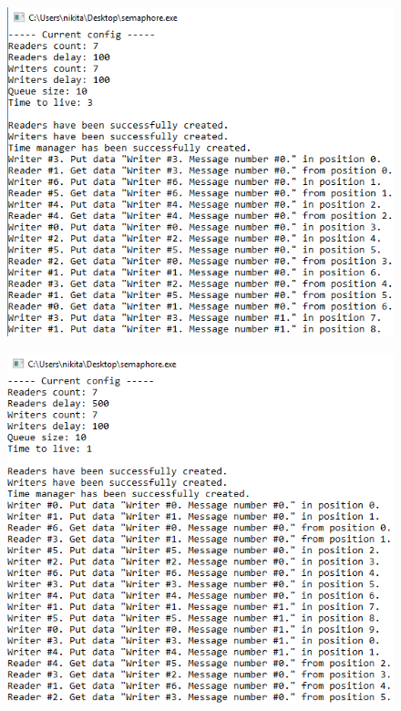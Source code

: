 \documentclass[14pt,a4paper,report]{report}
\begin{document}
\begin{figure}[h!]
	\centering
	\includegraphics[scale = 0.75]{images/p1_3_1.png}
	
	\caption{}
	\label{image:5}
\end{figure}

\begin{figure}[h!]
	\centering
	\includegraphics[scale = 0.75]{images/p1_3_2.png}
	
	\caption{}
	\label{image:6}
\end{figure}
\end{document}
